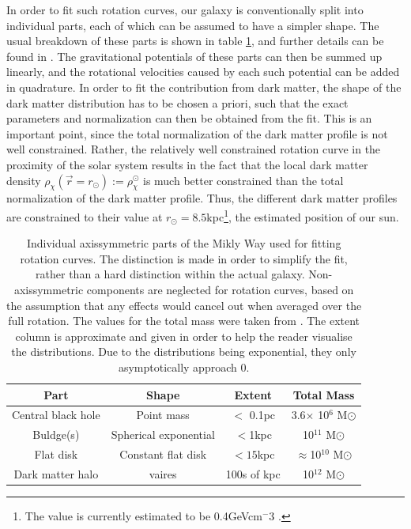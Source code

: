 In order to fit such rotation curves, our galaxy is conventionally split into individual parts, each of which can be assumed to have a simpler shape. The usual breakdown of these parts is shown in table \ref*{tab:MilkyWayBreakdown}, and further details can be found in \cite{Sofue_2016}. The gravitational potentials of these parts can then be summed up linearly, and the rotational velocities caused by each such potential can be added in quadrature. In order to fit the contribution from dark matter, the shape of the dark matter distribution has to be chosen a priori, such that the exact parameters and normalization can then be obtained from the fit. This is an important point, since the total normalization of the dark matter profile is not well constrained. Rather, the relatively well constrained rotation curve in the proximity of the solar system results in the fact that the local dark matter density $\rho_\chi(\vec{r}=r_\odot) := \rho_\chi^\odot$ is much better constrained than the total normalization of the dark matter profile. Thus, the different dark matter profiles are constrained to their value at $r_\odot = 8.5$kpc\footnote{The value is currently estimated to be 0.4GeVcm$^-3$ \cite{DM_review, Ibarra:2012cc, Sofue_2016, Sofue2020, PDG2022}.}, the estimated position of our sun. \\
\begin{table}[h]
    \centering
    \begin{tabular}{|c|c|c|c|}
        \hline
        Part & Shape & Extent & Total Mass \\
        \hline
        Central black hole & Point mass & $<$ 0.1pc & 3.6$\times$ 10$^6$ M$\odot$ \\
        \hline
        Buldge(s) & Spherical exponential & $<$1kpc & 10$^{11}$ M$\odot$ \\
        \hline
        Flat disk & Constant flat disk & $<15$kpc & $\approx$10$^{10}$ M$\odot$ \\
        \hline
        Dark matter halo & vaires & 100s of kpc & 10$^{12}$ M$\odot$ \\
        \hline
    \end{tabular}
    \label{tab:MilkyWayBreakdown}
    \caption{Individual axissymmetric parts of the Mikly Way used for fitting rotation curves. The distinction is made in order to simplify the fit, rather than a hard distinction within the actual galaxy. Non-axissymmetric components are neglected for rotation curves, based on the assumption that any effects would cancel out when averaged over the full rotation. The values for the total mass were taken from \cite{Sofue_2016}. The extent column is approximate and given in order to help the reader visualise the distributions. Due to the distributions being exponential, they only asymptotically approach 0.}

\end{table}

